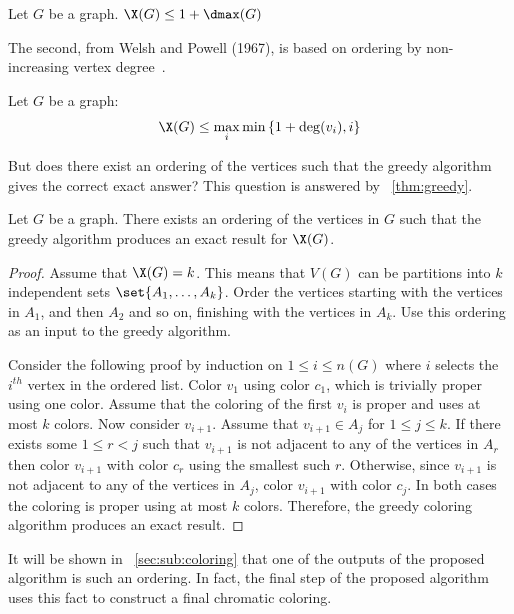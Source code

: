 \begin{theorem}
  \label{thm:upper}
  Let \(G\) be a graph.  \(\X(G)\le1+\dmax(G)\)
\end{theorem}

The second, from Welsh and Powell (1967), is based on ordering by non-increasing vertex degree~\cite{welsh}.

\begin{theorem}
  \label{thm:welsh}
  Let \(G\) be a graph:
  \[\X(G)\le\max_i\min\left\{1+\deg(v_i),i\right\}\]
\end{theorem}

But does there exist an ordering of the vertices such that the greedy algorithm gives the correct exact answer?
This question is answered by \theoremname~\ref{thm:greedy}.

\begin{theorem}
  \label{thm:greedy}
  Let \(G\) be a graph.  There exists an ordering of the vertices in \(G\) such that the greedy algorithm produces
  an exact result for \(\X(G)\).
\end{theorem}

\begin{proof}
  Assume that \(\X(G)=k\).  This means that \(V(G)\) can be partitions into \(k\) independent sets
  \(\set{A_1,\ldots,A_k}\).  Order the vertices starting with the vertices in \(A_1\), and then \(A_2\) and so on,
  finishing with the vertices in \(A_k\).  Use this ordering as an input to the greedy algorithm.

  Consider the following proof by induction on \(1\le i\le n(G)\) where \(i\) selects the \(i^{th}\) vertex in the
  ordered list.  Color \(v_1\) using color \(c_1\), which is trivially proper using one color.  Assume that the
  coloring of the first \(v_i\) is proper and uses at most \(k\) colors.  Now consider \(v_{i+1}\).  Assume that
  \(v_{i+1}\in A_j\) for \(1\le j\le k\).  If there exists some \(1\le r<j\) such that \(v_{i+1}\) is not adjacent
  to any of the vertices in \(A_r\) then color \(v_{i+1}\) with color \(c_r\) using the smallest such \(r\).
  Otherwise, since \(v_{i+1}\) is not adjacent to any of the vertices in \(A_j\), color \(v_{i+1}\) with color
  \(c_j\).  In both cases the coloring is proper using at most \(k\) colors.  Therefore, the greedy coloring
  algorithm produces an exact result.
\end{proof}

It will be shown in \sectionname~\ref{sec:sub:coloring} that one of the outputs of the proposed algorithm is such
an ordering.  In fact, the final step of the proposed algorithm uses this fact to construct a final chromatic
coloring.

